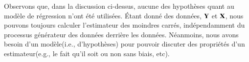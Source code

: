 Observons que, dans la discussion ci-dessus, aucune des hypothèses quant au modèle de régression n'ont été utilisées. \'Etant donné des données, $\mathbf Y$ et $\mathbf X$, nous pouvons toujours calculer l'estimateur des moindres carrés, indépendamment du processus générateur des données derrière les données. Néanmoins, nous avons besoin d'un modèle(i.e., d'hypothèses) pour pouvoir discuter des propriétés d'un estimateur(e.g., le fait qu'il soit ou non sans biais, etc).




 
